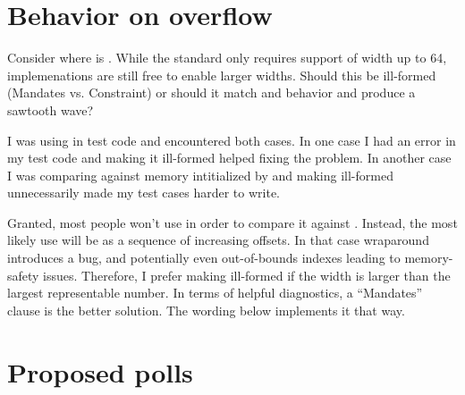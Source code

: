 \section{Behavior on overflow}\label{sec:overflow}
Consider  where  is
.
While the standard only requires support of \simd width up to 64,
implemenations are still free to enable larger widths.
Should this be ill-formed (Mandates vs. Constraint) or should it match
 and  behavior and produce a sawtooth
wave?

I was using \stdsimd{} in test code and encountered both cases.
In one case I had an error in my test code and making it ill-formed helped fixing the problem.
In another case I was comparing against memory intitialized by 
and making \stdsimd{} ill-formed unnecessarily made my test cases harder
to write.

Granted, most people won't use \stdsimd{} in order to compare it against
\std{}.
Instead, the most likely use will be as a sequence of increasing offsets.
In that case wraparound introduces a bug, and potentially even out-of-bounds
indexes leading to memory-safety issues.
Therefore, I prefer making \stdsimd{} ill-formed if the \simd width is
larger than the largest representable number.
In terms of helpful diagnostics, a “Mandates” clause is the better solution.
The wording below implements it that way.

\section{Proposed polls}









